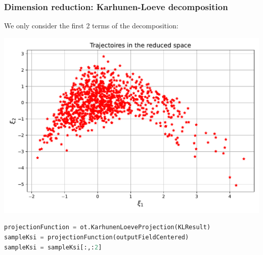 \documentclass[aspectratio=169]{beamer}
\begin{document}

\begin{frame}[containsverbatim]
\frametitle{Dimension reduction: Karhunen-Loeve decomposition}

\scriptsize

We only consider the first 2 terms of the decomposition:

\centering
\includegraphics[width=.7\textwidth]{figures/Reduced_Space.pdf}

\begin{lstlisting}[language=Python, numbers = none]
projectionFunction = ot.KarhunenLoeveProjection(KLResult)
sampleKsi = projectionFunction(outputFieldCentered)
sampleKsi = sampleKsi[:,:2]
\end{lstlisting}

\end{frame}

\end{document}
